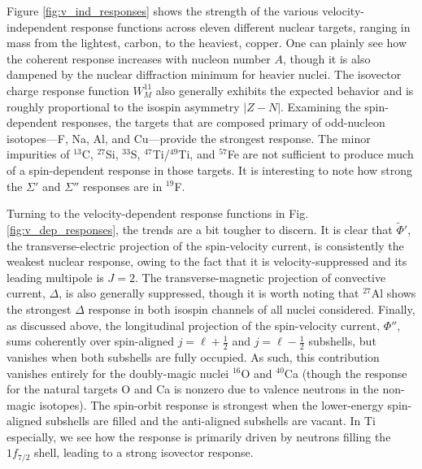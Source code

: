 \documentclass[12pt,letterpaper]{book}
\begin{document}
Figure \ref{fig:v_ind_responses} shows the strength of the various velocity-independent response functions across eleven different nuclear targets, ranging in mass from the lightest, carbon, to the heaviest, copper. One can plainly see how the coherent response increases with nucleon number $A$, though it is also dampened by the nuclear diffraction minimum for heavier nuclei. The isovector charge response function $W_M^{11}$ also generally exhibits the expected behavior and is roughly proportional to the isospin asymmetry $|Z-N|$. Examining the spin-dependent responses, the targets that are composed primary of odd-nucleon isotopes---F, Na, Al, and Cu---provide the strongest response. The minor impurities of $^{13}$C, $^{27}$Si, $^{33}$S, $^{47}$Ti/$^{49}$Ti, and $^{57}$Fe are not sufficient to produce much of a spin-dependent response in those targets. It is interesting to note how strong the $\Sigma'$ and $\Sigma''$ responses are in $^{19}$F.

Turning to the velocity-dependent response functions in Fig. \ref{fig:v_dep_responses}, the trends are a bit tougher to discern. It is clear that $\tilde{\Phi}'$, the transverse-electric projection of the spin-velocity current, is consistently the weakest nuclear response, owing to the fact that it is velocity-suppressed and its leading multipole is $J=2$. The transverse-magnetic projection of convective current, $\Delta$, is also generally suppressed, though it is worth noting that $^{27}$Al shows the strongest $\Delta$ response in both isospin channels of all nuclei considered. Finally, as discussed above, the longitudinal projection of the spin-velocity current, $\Phi''$, sums coherently over spin-aligned $j=\ell+\frac{1}{2}$ and $j=\ell-\frac{1}{2}$ subshells, but vanishes when both subshells are fully occupied. As such, this contribution vanishes entirely for the doubly-magic nuclei $^{16}$O and $^{40}$Ca (though the response for the natural targets O and Ca is nonzero due to valence neutrons in the non-magic isotopes). The spin-orbit response is strongest when the lower-energy spin-aligned subshells are filled and the anti-aligned subshells are vacant. In Ti especially, we see how the response is primarily driven by neutrons filling the $1f_{7/2}$ shell, leading to a strong isovector response.
\end{document}
